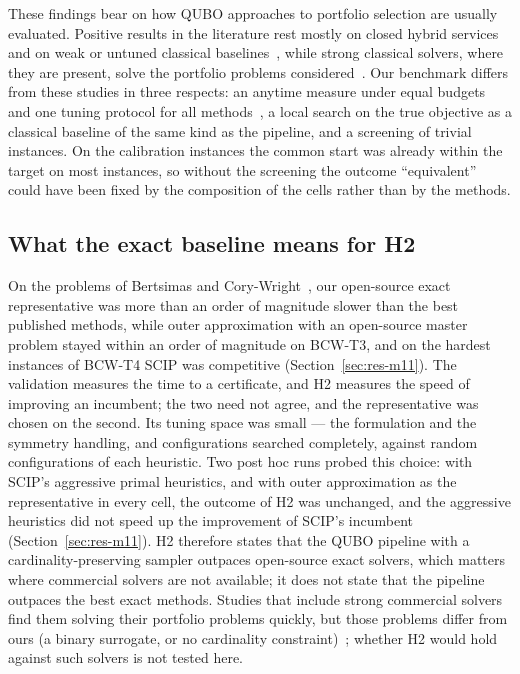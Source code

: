 These findings bear on how QUBO approaches to portfolio selection are usually evaluated. Positive results in the
literature rest mostly on closed hybrid services and on weak or untuned classical
baselines~\cite{mugel2022dynamic,lang2022strategic,kim2025quantum}, while strong classical solvers, where they are
present, solve the portfolio problems considered~\cite{lozano2026where,stopfer2025quantum,chen2025benchmarking}. Our
benchmark differs from these studies in three respects: an anytime measure under equal budgets and one tuning
protocol for all methods~\cite{barr1995designing,bucher2024towards}, a local search on the true objective as a
classical baseline of the same kind as the pipeline, and a screening of trivial instances. On the calibration
instances the common start was already within the target on most instances, so without the screening the outcome
``equivalent'' could have been fixed by the composition of the cells rather than by the methods.

\subsection{What the exact baseline means for H2}\label{sec:disc-baseline}

On the problems of Bertsimas and Cory-Wright~\cite{bertsimas2022scalable}, our open-source exact representative was more
than an order of magnitude slower than the best published methods, while outer approximation with an open-source master
problem stayed within an order of magnitude on BCW-T3, and on the hardest instances of BCW-T4 SCIP was competitive
(Section~\ref{sec:res-m11}). The validation measures the time to a certificate, and H2 measures the speed of improving
an incumbent; the two need not agree, and the representative was chosen on the second. Its tuning space was small
--- the formulation and the symmetry handling,  and 
configurations searched completely, against  random configurations of each heuristic.
Two post hoc runs probed this choice: with SCIP's aggressive primal heuristics, and with outer approximation as the
representative in every cell, the outcome of H2 was unchanged, and the aggressive heuristics did not speed up the
improvement of SCIP's incumbent (Section~\ref{sec:res-m11}). H2 therefore states that the QUBO pipeline with a
cardinality-preserving sampler outpaces open-source exact solvers, which matters where commercial solvers are not
available; it does not state that the pipeline outpaces the best exact methods. Studies that include
strong commercial solvers find them solving their portfolio problems quickly, but those problems differ from ours (a
binary surrogate, or no cardinality constraint)~\cite{lozano2026where,stopfer2025quantum}; whether H2 would hold against
such solvers is not tested here.

